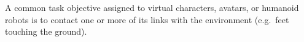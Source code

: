 A common task objective assigned to virtual characters, avatars, or humanoid robots is to contact one or more of its links with the environment (e.g.\ feet touching the ground).



